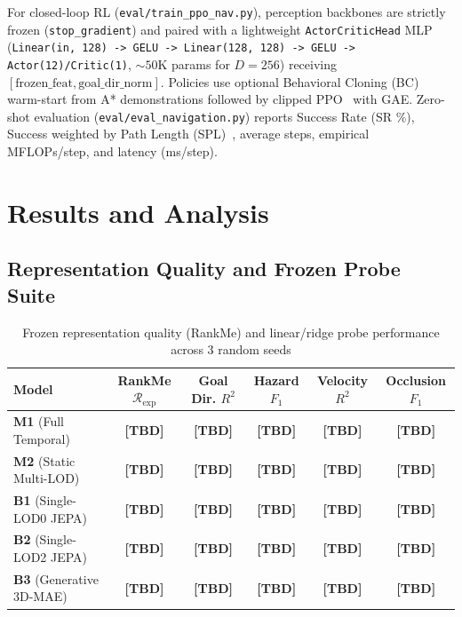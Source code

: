 \documentclass[runningheads]{llncs}
\begin{document}
For closed-loop RL (\texttt{eval/train\_ppo\_nav.py}), perception backbones are strictly frozen (\texttt{stop\_gradient}) and paired with a lightweight \texttt{ActorCriticHead} MLP (\texttt{Linear(in, 128) -> GELU -> Linear(128, 128) -> GELU -> Actor(12)/Critic(1)}, $\sim 50\text{K}$ params for $D=256$) receiving $[\text{frozen\_feat}, \text{goal\_dir\_norm}]$. Policies use optional Behavioral Cloning (BC) warm-start from A* demonstrations followed by clipped PPO~\cite{schulman2017ppo} with GAE. Zero-shot evaluation (\texttt{eval/eval\_navigation.py}) reports Success Rate (SR \%), Success weighted by Path Length (SPL)~\cite{anderson2018spl}, average steps, empirical MFLOPs/step, and latency (ms/step).

\section{Results and Analysis}

\subsection{Representation Quality and Frozen Probe Suite}

\begin{table}[t]
\centering
\caption{Frozen representation quality (RankMe) and linear/ridge probe performance across 3 random seeds}
\label{tab:probes}
\begin{tabular}{l c c c c c}
\toprule
\textbf{Model} & \textbf{RankMe} $\mathcal{R}_{\text{exp}}$ & \textbf{Goal Dir.} $R^2$ & \textbf{Hazard} $F_1$ & \textbf{Velocity} $R^2$ & \textbf{Occlusion} $F_1$ \\
\midrule
\textbf{M1} (Full Temporal)      & \textbf{[TBD]} & \textbf{[TBD]} & \textbf{[TBD]} & \textbf{[TBD]} & \textbf{[TBD]} \\
\textbf{M2} (Static Multi-LOD)   & \textbf{[TBD]} & \textbf{[TBD]} & \textbf{[TBD]} & \textbf{[TBD]} & \textbf{[TBD]} \\
\textbf{B1} (Single-LOD0 JEPA)   & \textbf{[TBD]} & \textbf{[TBD]} & \textbf{[TBD]} & \textbf{[TBD]} & \textbf{[TBD]} \\
\textbf{B2} (Single-LOD2 JEPA)   & \textbf{[TBD]} & \textbf{[TBD]} & \textbf{[TBD]} & \textbf{[TBD]} & \textbf{[TBD]} \\
\textbf{B3} (Generative 3D-MAE)  & \textbf{[TBD]} & \textbf{[TBD]} & \textbf{[TBD]} & \textbf{[TBD]} & \textbf{[TBD]} \\
\bottomrule
\end{tabular}
\end{table}
\end{document}
